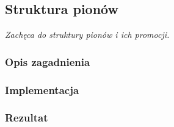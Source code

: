 \subsection{Struktura pionów}
\label{subsec:struktura-pionow}
\textit{Zachęca do struktury pionów i ich promocji.}

\subsubsection{Opis zagadnienia}
\subsubsection{Implementacja}
\subsubsection{Rezultat}